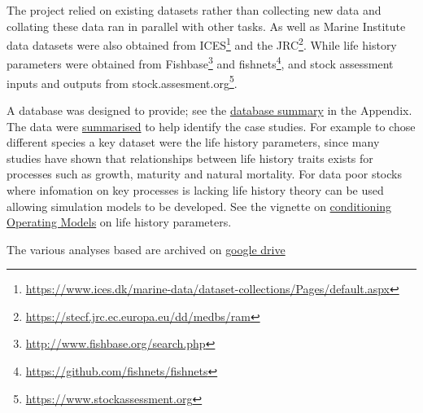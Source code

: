 The project relied on existing datasets rather than collecting new data and collating these data ran in parallel with other tasks. As well as Marine Institute data datasets were also obtained from ICES\footnote{\url{https://www.ices.dk/marine-data/dataset-collections/Pages/default.aspx}} and the JRC\footnote{\url{https://stecf.jrc.ec.europa.eu/dd/medbs/ram}}. While life history parameters were obtained from Fishbase\footnote{\url{http://www.fishbase.org/search.php}} and fishnets\footnote{\url{https://github.com/fishnets/fishnets}}, and stock assessment inputs and outputs from stock.assesment.org\footnote{\url{https://www.stockassessment.org}}.

A database was designed to provide; see the \hyperref[appendix:db]{database summary} in the Appendix. The data were \href{https://3o2y9wugzp1kfxr5hvzgzq-on.drv.tw/MyDas/tasks/1/stockprioritisation.nb.html}{summarised} to help identify the case studies. For example to chose different species a key dataset were the life history parameters, since many studies have shown that relationships between life history traits exists for processes such as growth, maturity and natural mortality. For data poor stocks where infomation on key processes is lacking life history theory can be used allowing simulation models to be developed. See the vignette on \href{https://3o2y9wugzp1kfxr5hvzgzq-on.drv.tw/MyDas/vignettes/conditioning.html}{conditioning Operating Models} on life history parameters. 

The various analyses based are archived on \href{https://drive.google.com/drive/folders/1pzXh8j-Y4dtJikFqP7RUuwBu0XY0a9ao?usp=sharing}{google drive} 



